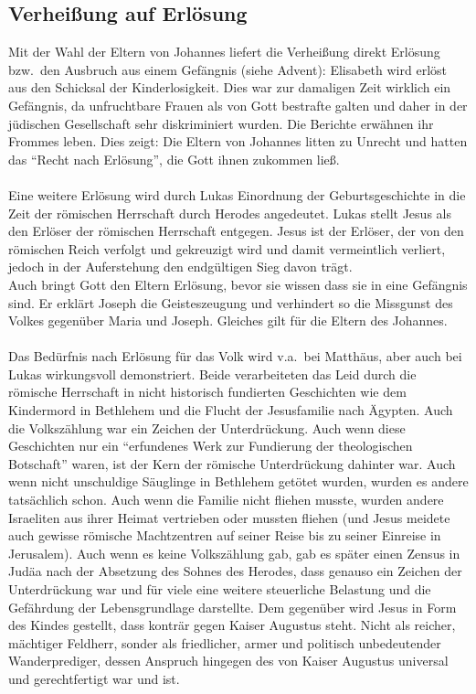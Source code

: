 \subsection{Verheißung auf Erlösung}
Mit der Wahl der Eltern von Johannes liefert die Verheißung direkt Erlösung bzw.\ den Ausbruch aus einem Gefängnis (siehe Advent): Elisabeth  wird erlöst aus den Schicksal der Kinderlosigkeit. Dies war zur damaligen Zeit wirklich ein Gefängnis, da unfruchtbare Frauen als von Gott bestrafte galten und daher in der jüdischen Gesellschaft sehr diskriminiert wurden. Die Berichte erwähnen ihr Frommes leben. Dies zeigt: Die Eltern von Johannes litten zu Unrecht und hatten das ``Recht nach Erlösung'', die Gott ihnen zukommen ließ.
\\~\\
Eine weitere Erlösung wird durch Lukas Einordnung der Geburtsgeschichte in die Zeit der römischen Herrschaft durch Herodes angedeutet. Lukas stellt Jesus als den Erlöser der römischen Herrschaft entgegen. Jesus ist der Erlöser, der von den römischen Reich verfolgt und gekreuzigt wird und damit vermeintlich verliert, jedoch in der Auferstehung den endgültigen Sieg davon trägt.
\\ 
Auch bringt Gott den Eltern Erlösung, bevor sie wissen dass sie in eine  Gefängnis sind. Er erklärt Joseph die Geisteszeugung und verhindert so die Missgunst des Volkes gegenüber Maria und Joseph. Gleiches gilt für die Eltern des Johannes. 
\\~\\
Das Bedürfnis nach Erlösung für das Volk wird v.a.\ bei Matthäus, aber auch bei Lukas wirkungsvoll demonstriert. Beide verarbeiteten das Leid durch die römische Herrschaft in nicht historisch fundierten Geschichten wie dem Kindermord in Bethlehem und die Flucht der Jesusfamilie nach Ägypten. Auch die Volkszählung war ein Zeichen der Unterdrückung. Auch wenn diese Geschichten nur ein ``erfundenes Werk zur Fundierung der theologischen Botschaft'' waren, ist der Kern der römische Unterdrückung dahinter war. Auch wenn nicht unschuldige Säuglinge in Bethlehem getötet wurden, wurden es andere tatsächlich schon. Auch wenn die Familie nicht fliehen musste, wurden andere Israeliten aus ihrer Heimat vertrieben oder mussten fliehen (und Jesus meidete auch gewisse römische Machtzentren auf seiner Reise bis zu seiner Einreise in Jerusalem). Auch wenn es keine Volkszählung gab, gab es später einen Zensus in Judäa nach der Absetzung des Sohnes des Herodes, dass genauso ein Zeichen der Unterdrückung war und für viele eine weitere steuerliche Belastung und die Gefährdung der Lebensgrundlage darstellte. Dem gegenüber wird Jesus in Form des Kindes gestellt, dass konträr gegen Kaiser Augustus steht. Nicht als reicher, mächtiger Feldherr, sonder als friedlicher, armer und politisch unbedeutender Wanderprediger, dessen Anspruch hingegen des von Kaiser Augustus universal und gerechtfertigt war und ist. 

